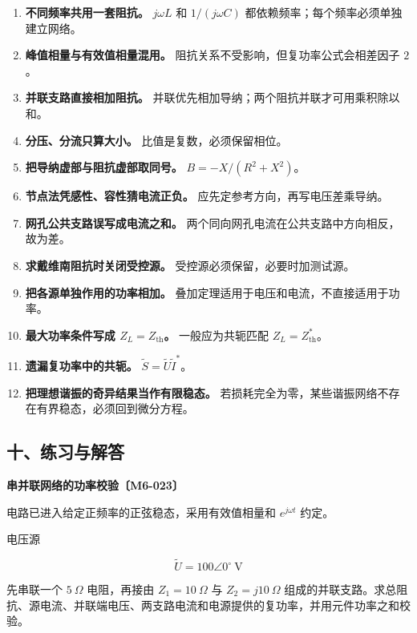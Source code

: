 \begin{enumerate}
\def\labelenumi{\arabic{enumi}.}
\tightlist
\item
  \textbf{不同频率共用一套阻抗。} \(j\omega L\) 和 \(1/(j\omega C)\)
  都依赖频率；每个频率必须单独建立网络。
\item
  \textbf{峰值相量与有效值相量混用。}
  阻抗关系不受影响，但复功率公式会相差因子 \(2\)。
\item
  \textbf{并联支路直接相加阻抗。}
  并联优先相加导纳；两个阻抗并联才可用乘积除以和。
\item
  \textbf{分压、分流只算大小。} 比值是复数，必须保留相位。
\item
  \textbf{把导纳虚部与阻抗虚部取同号。} \(B=-X/(R^2+X^2)\)。
\item
  \textbf{节点法凭感性、容性猜电流正负。}
  应先定参考方向，再写电压差乘导纳。
\item
  \textbf{网孔公共支路误写成电流之和。}
  两个同向网孔电流在公共支路中方向相反，故为差。
\item
  \textbf{求戴维南阻抗时关闭受控源。} 受控源必须保留，必要时加测试源。
\item
  \textbf{把各源单独作用的功率相加。}
  叠加定理适用于电压和电流，不直接适用于功率。
\item
  \textbf{最大功率条件写成 \(Z_L=Z_{\mathrm{th}}\)。} 一般应为共轭匹配
  \(Z_L=Z_{\mathrm{th}}^{*}\)。
\item
  \textbf{遗漏复功率中的共轭。}
  \(\widetilde S=\widetilde U\widetilde I^{*}\)。
\item
  \textbf{把理想谐振的奇异结果当作有限稳态。}
  若损耗完全为零，某些谐振网络不存在有界稳态，必须回到微分方程。
\end{enumerate}

\subsection{十、练习与解答}\label{m6:ux5341ux7ec3ux4e60ux4e0eux89e3ux7b54}

\par{}
\noindent\begin{minipage}{\linewidth}

\textbf{串并联网络的功率校验〔M6-023〕}

电路已进入给定正频率的正弦稳态，采用有效值相量和 \(e^{j\omega t}\)
约定。

电压源

\[
\widetilde U=100\angle0^{\circ}\ \mathrm V
\]

先串联一个 \(5\ \Omega\) 电阻，再接由 \(Z_1=10\ \Omega\) 与
\(Z_2=j10\ \Omega\)
组成的并联支路。求总阻抗、源电流、并联端电压、两支路电流和电源提供的复功率，并用元件功率之和校验。

\end{minipage}\par

